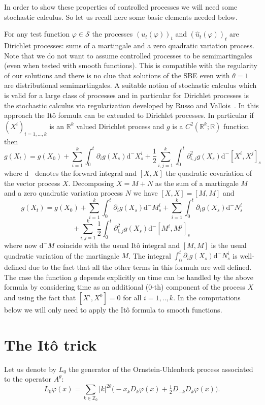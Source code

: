 \documentclass[11pt,a4paper,draft,reqno]{amsart}
\newcommand{\RR}{\mathbb{R}}
\newcommand{\dd}{\mathrm{d}}
\newcommand{\cS}{\mathcal{S}}
\begin{document}
In order to show these properties of controlled processes we will need some stochastic calculus. So let us recall here some basic elements needed below.

 
For any test function $\varphi\in\cS$ the processes $(u_t(\varphi))_{t}$ and $(\hat u_t(\varphi))_{t}$ are Dirichlet processes: sums of a martingale and a zero quadratic variation process. 
Note that we do not want to assume controlled processes to be semimartingales (even when tested with smooth functions). This is compatible with the regularity of our solutions and there is no clue that solutions of the SBE even with $\theta=1$ are distributional semimartingales. A suitable notion of stochastic calculus which is valid for a large class of processes and in particular for Dirichlet processes is the stochastic calculus via regularization developed by Russo and Vallois~\cite{RV}. In this approach the It\^o formula can be extended to Dirichlet processes. In particular if $(X^i)_{i=1,\dots,k}$ is an $\RR^k$ valued Dirichlet process and $g$ is a $C^2(\RR^k;\RR)$ function then
$$
g(X_t) = g(X_0) + \sum_{i=1}^k\int_0^t \partial_i g(X_s) \dd^- X^i_s + \frac12 \sum_{i,j=1}^k \int_0^t \partial^2_{i,j} g(X_s) \dd^- [X^i,X^j]_s
$$
where $\dd^-$ denotes the forward integral and $[X,X]$ the quadratic covariation of the vector process $X$. Decomposing $X=M+N$ as the sum of a martingale $M$ and a zero quadratic variation process $N$ we have $[X,X]=[M,M]$ and
$$
g(X_t) = g(X_0) +  \sum_{i=1}^k \int_0^t \partial_i g(X_s) \dd^- M^i_s +  \sum_{i=1}^k \int_0^t \partial_i g(X_s) \dd^- N^i_s
$$
$$ +   \sum_{i,j=1}^k\frac12 \int_0^t \partial^2_{i,j} g(X_s) \dd^- [M^i,M^j]_s
$$
where now $\dd^- M$ coincide with  the usual It\^o integral and $[M,M]$ is the usual quadratic variation of the martingale $M$. The integral $\int_0^t \partial_i g(X_s) \dd^- N^i_s$ is well-defined due to the fact that all the other terms in this formula are well defined. The case the function $g$ depends explicitly on time can be handled by the above formula by considering time as an additional (0-th) component of the process $X$ and using the fact that $[X^i,X^0]=0$ for all $i=1,..,k$. In the computations below we will only need to apply the It\^o formula to smooth functions.


\section{The It\^o trick}
\label{sec:ito-trick}
Let us denote by $L_0$ the generator of the Ornstein-Uhlenbeck process associated to the operator $A^\theta$:
\[
L_0 \varphi(x) = \sum_{k \in \mathbb Z_0} |k|^{2\theta} \big(- x_k D_k \varphi(x) + \tfrac{1}{2} D_{-k}D_k \varphi(x)\big). 
\]
\end{document}
